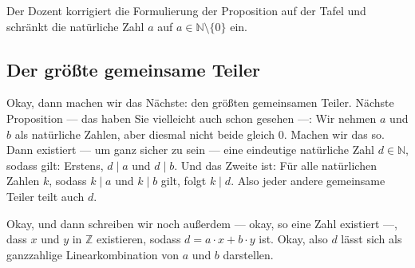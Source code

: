 \begin{meta-note}
Der Dozent korrigiert die Formulierung der Proposition auf der Tafel und schränkt die natürliche Zahl $a$ auf $a \in \mathbb{N} \setminus \{0\}$ ein.
\end{meta-note}

\subsection{Der größte gemeinsame Teiler}

\begin{spoken-clean}[00:13:37 - 00:17:09]
Okay, dann machen wir das Nächste: den größten gemeinsamen Teiler. Nächste Proposition --- das haben Sie vielleicht auch schon gesehen ---: Wir nehmen $a$ und $b$ als natürliche Zahlen, aber diesmal nicht beide gleich $0$. Machen wir das so. Dann existiert --- um ganz sicher zu sein  --- eine eindeutige natürliche Zahl $d \in \mathbb{N}$, sodass gilt: Erstens, $d \mid a$ und $d \mid b$. Und das Zweite ist: Für alle natürlichen Zahlen $k$, sodass $k \mid a$ und $k \mid b$ gilt, folgt $k \mid d$. Also jeder andere gemeinsame Teiler teilt auch $d$.

Okay, und dann schreiben wir noch außerdem --- okay, so eine Zahl existiert ---, dass $x$ und $y$ in $\mathbb{Z}$ existieren, sodass $d = a \cdot x + b \cdot y$ ist. Okay, also $d$ lässt sich als ganzzahlige Linearkombination von $a$ und $b$ darstellen.
\end{spoken-clean}

\begin{math-stroke}

\end{math-stroke}

